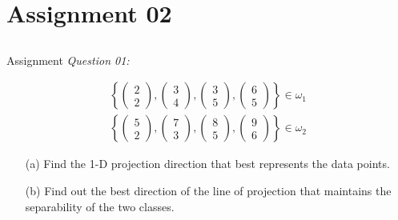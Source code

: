 \section{Assignment 02}
\subsection{}

\begin{frame}{Assignment}
\textit{\color{slidecolor}Question 01:}
\begin{scriptsize}
\begin{equation}
\begin{array}{l}
\left\{ {\left( {\begin{array}{*{20}{c}}
2\\
2
\end{array}} \right),\left( {\begin{array}{*{20}{c}}
3\\
4
\end{array}} \right),\left( {\begin{array}{*{20}{c}}
3\\
5
\end{array}} \right),\left( {\begin{array}{*{20}{c}}
6\\
5
\end{array}} \right)} \right\}\in \omega_1\\
\left\{ {\left( {\begin{array}{*{20}{c}}
5\\
2
\end{array}} \right),\left( {\begin{array}{*{20}{c}}
7\\
3
\end{array}} \right),\left( {\begin{array}{*{20}{c}}
8\\
5
\end{array}} \right),\left( {\begin{array}{*{20}{c}}
9\\
6
\end{array}} \right)} \right\}\in \omega_2
\end{array}\nonumber
\end{equation}
\end{scriptsize}
\begin{itemize}
\item[(a)] Find the 1-D projection direction that best represents the data points.
\item[(b)] Find out the best direction of the line of projection that maintains the separability of the two classes.
\end{itemize} 
\end{frame}

